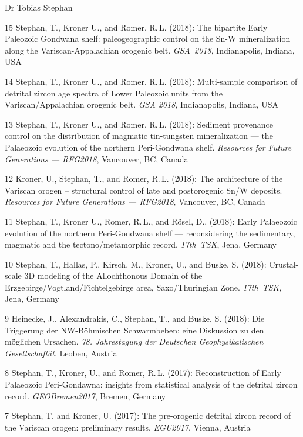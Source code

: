\documentclass[10pt, paper=letter]{scrartcl} %
\begin{document}
\begin{cv}{\textsf{Dr Tobias Stephan}}
\begin{cvlist}{}
        \item[15] Stephan, T., Kroner U., and Romer, R.\,L. (2018): The bipartite Early Paleozoic Gondwana shelf: paleogeographic control on the Sn-W mineralization along the Variscan-Appalachian orogenic belt. \mbox{\textit{GSA 2018}}, Indianapolis, Indiana, USA
        \item[14] Stephan, T., Kroner U., and Romer, R.\,L. (2018): Multi-sample comparison of detrital zircon age spectra of Lower Paleozoic units from the Variscan\-/Appalachian orogenic belt. \textit{GSA 2018}, Indianapolis, Indiana, USA
        \item[13] Stephan, T., Kroner U., and Romer, R.\,L. (2018): Sediment provenance control on the distribution of magmatic tin-tungsten mineralization --- the Palaeozoic evolution of the northern Peri-Gondwana shelf. \textit{Resources for Future Generations --- RFG2018}, Vancouver, BC, Canada
        \item[12]Kroner, U., Stephan, T., and Romer, R.\,L. (2018): The architecture of the Variscan orogen – structural control of late and postorogenic Sn/W deposits.  \textit{Resources for Future Generations --- RFG2018}, Vancouver, BC, Canada
        \item[11] Stephan, T., Kroner U., Romer, R.\,L., and R\"osel, D., (2018): Early Palaeozoic evolution of the northern Peri-Gondwana shelf --- reconsidering the sedimentary, magmatic and the tectono\-/metamorphic record. \mbox{\textit{17th TSK}}, Jena, Germany
        \item[10] Stephan, T., Hallas, P., Kirsch, M., Kroner, U., and Buske, S. (2018): Crustal-scale 3D modeling of the Allochthonous Domain of the Erzgebirge\-/Vogtland\-/Fichtelgebirge area, Saxo\-/Thuringian Zone. \textit{17th~TSK}, Jena, Germany
        \item[9] Heinecke, J., Alexandrakis, C., Stephan, T., and Buske, S. (2018): Die Triggerung der NW-B\"ohmischen Schwarmbeben: eine Diskussion zu den m\"oglichen Ursachen. \textit{78. Jahrestagung der Deutschen Geophysikalischen Gesellschaft\"at}, Leoben, Austria
        \item[8] Stephan, T., Kroner, U., and Romer, R.\,L. (2017): Reconstruction of Early Palaeozoic Peri-Gondawna: insights from statistical analysis of the detrital zircon record. \textit{GEOBremen2017}, Bremen, Germany
        \item[7] Stephan, T. and Kroner, U. (2017): The pre-orogenic detrital zircon record of the Variscan orogen: preliminary results. \textit{EGU2017}, \mbox{Vienna}, Austria

\end{cvlist}
\end{cv}
\end{document}
